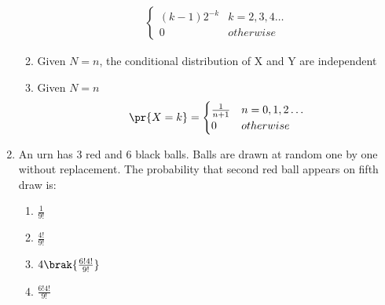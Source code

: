 \begin{enumerate}[label=\thesection.\arabic*.,ref=\thesection.\theenumi]
\begin{enumerate}
{\begin{align}
\begin{cases}
            (k-1)2^{-k} & k=2,3,4 \ldots
            \\
            0 & otherwise
        \end{cases}
    \end{align}
    }
    \item Given $N = n$, the conditional distribution of X and Y are independent
    \item Given $N = n$
     \begin{align}
        \pr{X = k} =
        \begin{cases}
            \frac{1}{n+1} & n=0,1,2 \ldots
            \\
            0 & otherwise
        \end{cases}
    \end{align}
\end{enumerate}
%
\item An urn has 3 red and 6 black balls. Balls are drawn at random one by one without replacement. The probability that second red ball appears on fifth draw is: \\
\begin{enumerate}
    \item $\frac{1}{9!}$
    \newline
    \item $\frac{4!}{9!}$
    \newline
    \item $4\brak{\frac{6!4!}{9!}}$
    \newline
    \item $\frac{6!4!}{9!}$
\end{enumerate}
%
%
\solution

\end{enumerate}
